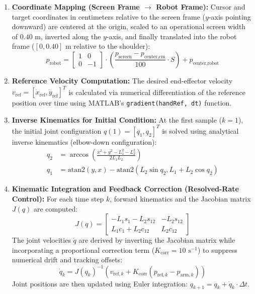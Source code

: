 \begin{enumerate}
	\item \textbf{Coordinate Mapping (Screen Frame $\to$ Robot Frame):}
	Cursor and target coordinates in centimeters relative to the screen frame ($y$-axis pointing downward) are centered at the origin, scaled to an operational screen width of $0.40\text{ m}$, inverted along the $y$-axis, and finally translated into the robot frame ($[0, 0.40]\text{ m}$ relative to the shoulder):
	\begin{equation*}
		p_{\text{robot}} = \begin{bmatrix} 1 & 0 \\ 0 & -1 \end{bmatrix} \cdot \left( \frac{p_{\text{screen}} - p_{\text{center,cm}}}{100} \cdot S \right) + p_{\text{center,robot}}
	\end{equation*}
	
	\item \textbf{Reference Velocity Computation:}
	The desired end-effector velocity $v_{\text{ref}} = [\dot{x}_{\text{ref}}, \dot{y}_{\text{ref}}]^T$ is calculated via numerical differentiation of the reference position over time using MATLAB's \texttt{gradient(handRef, dt)} function.
	
	\item \textbf{Inverse Kinematics for Initial Condition:}
	At the first sample ($k=1$), the initial joint configuration $q(1) = [q_1, q_2]^T$ is solved using analytical inverse kinematics (elbow-down configuration):
	\begin{align*}
		q_2 &= \arccos\left(\frac{x^2 + y^2 - L_1^2 - L_2^2}{2 L_1 L_2}\right) \\
		q_1 &= \text{atan2}(y, x) - \text{atan2}(L_2 \sin q_2, L_1 + L_2 \cos q_2)
	\end{align*}
	
	\item \textbf{Kinematic Integration and Feedback Correction (Resolved-Rate Control):}
	For each time step $k$, forward kinematics and the Jacobian matrix $J(q)$ are computed:
	\begin{equation*}
		J(q) = \begin{bmatrix} -L_1 s_1 - L_2 s_{12} & -L_2 s_{12} \\ L_1 c_1 + L_2 c_{12} & L_2 c_{12} \end{bmatrix}
	\end{equation*}
	The joint velocities $\dot{q}$ are derived by inverting the Jacobian matrix while incorporating a proportional correction term ($K_{\text{corr}} = 10\text{ s}^{-1}$) to suppress numerical drift and tracking offsets:
	\begin{equation*}
		\dot{q}_k = J(q_k)^{-1} \left( v_{\text{ref}, k} + K_{\text{corr}} (p_{\text{ref}, k} - p_{\text{arm}, k}) \right)
	\end{equation*}
	Joint positions are then updated using Euler integration: $q_{k+1} = q_k + \dot{q}_k \cdot \Delta t$.
	

\end{enumerate}
